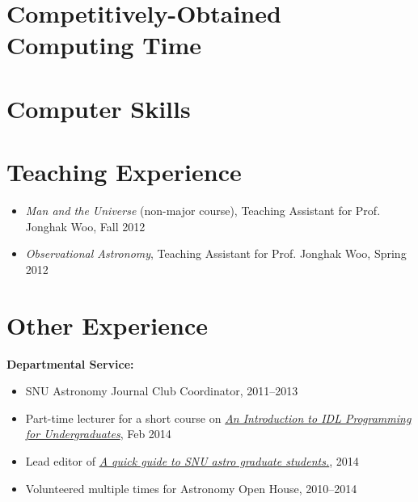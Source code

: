 \documentclass[11pt,letterpaper,roman]{moderncv}        %
\begin{document}
\section{Competitively-Obtained Computing Time}

\section{Computer Skills}

\section{Teaching Experience}
\begin{itemize}
\setlength\itemsep{0.0em}
\item \textit{Man and the Universe} (non-major course), Teaching
  Assistant for Prof. Jonghak Woo,  Fall 2012
\item \textit{Observational Astronomy}, Teaching Assistant for
  Prof. Jonghak Woo, Spring 2012
\end{itemize}

\section{Other Experience}
\textbf{Departmental Service:}
\begin{itemize}
\setlength\itemsep{0.0em}
\item SNU Astronomy Journal Club Coordinator, 2011--2013
\item Part-time lecturer for a short course on
  \href{http://astro.snu.ac.kr/~idl_lecture}{\textit{\color{dodgerblue}An Introduction
      to IDL Programming for Undergraduates}}, Feb 2014
\item Lead editor of 
  \href{https://github.com/astrosnu/grad_manual}{\color{dodgerblue}\textit{A quick guide
      to SNU astro graduate students.}}, 2014
\item Volunteered multiple times for Astronomy Open House, 2010--2014
\end{itemize}
\end{document}
